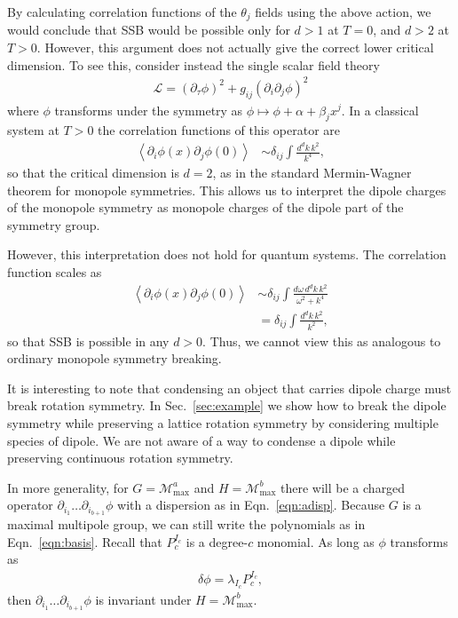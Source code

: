 \documentclass[pra,aps,twocolumn, amsfonts,amsmath,amssymb,nofootinbib,superscriptaddress]{revtex4-2}
\newcommand{\nn}{\nonumber\\}
\renewcommand{\max}{\text{max}}
\begin{document}
By calculating correlation functions of the $\theta_j$ fields using the above action, we would conclude that SSB would be possible only for $d>1$ at $T=0$, and $d>2$ at $T>0$. However, this argument does not actually give the correct lower critical dimension. To see this, consider instead the single scalar field theory 
\begin{align}
    \mathcal{L} = (\partial_\tau\phi)^2 + g_{ij} (\partial_i\partial_j\phi)^2 \end{align}
where $\phi$ transforms under the symmetry as $\phi \mapsto \phi + \alpha + \beta_jx^j$.  In a classical system at $T>0$ the correlation functions of this operator are
\begin{align}
\left\langle \partial_i\phi(x) \partial_j\phi(0) \right\rangle &\sim \delta_{ij} \int \frac{d^dk\, k^2}{k^4},
\end{align}
so that the critical dimension is $d=2$, as in the standard Mermin-Wagner theorem for monopole symmetries. This allows us to interpret the dipole charges of the monopole symmetry as monopole charges of the dipole part of the symmetry group.

However, this interpretation does not hold for  quantum systems. The correlation function scales as
\begin{align}
\left\langle \partial_i\phi(x) \partial_j\phi(0) \right\rangle &\sim \delta_{ij} \int \frac{d\omega\, d^dk\, k^2}{\omega^2 + k^4}\nn
&= \delta_{ij} \int \frac{d^dk\, k^2}{k^2},
\end{align}
so that SSB is possible in any $d>0$. Thus, we cannot view this as analogous to ordinary monopole symmetry breaking.


It is interesting to note that condensing an object that carries dipole charge must break rotation symmetry. In Sec.~\ref{sec:example} we show how to break the dipole symmetry while preserving a lattice rotation symmetry by considering multiple species of dipole. We are not aware of a way to condense a dipole while preserving continuous rotation symmetry.

In more generality, for $G = \mathcal{M}^{a}_\text{max}$ and $H = \mathcal{M}^b_\text{max}$ there will be a charged operator $\partial_{i_1} \dots \partial_{i_{b+1}}\phi$ with a dispersion as in Eqn.~\ref{eqn:adisp}. Because $G$ is a maximal multipole group, we can still write the polynomials as in Eqn.~\ref{eqn:basis}. Recall that $P_c^{I_c}$ is a degree-$c$ monomial. As long as $\phi$ transforms as 
\begin{align}
\delta \phi = \lambda_{I_c} P_c^{I_c}, \label{eqn:partial}
\end{align}
then $\partial_{i_1} \dots \partial_{i_{b+1}} \phi$ is invariant under $H=\mathcal{M}^b_\max$. 
\end{document}
